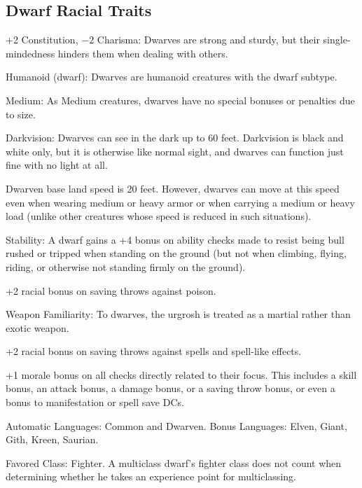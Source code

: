 \subsection{Dwarf Racial Traits}
\begin{itemize*}
    \item +2 Constitution, $-2$ Charisma: Dwarves are strong and sturdy, but their single‐mindedness hinders them when dealing with others.
    \item Humanoid (dwarf): Dwarves are humanoid creatures with the dwarf subtype.
    \item Medium: As Medium creatures, dwarves have no special bonuses or penalties due to size.
    \item Darkvision: Dwarves can see in the dark up to 60 feet. Darkvision is black and white only, but it is otherwise like normal sight, and dwarves can function just fine with no light at all.
    \item Dwarven base land speed is 20 feet. However, dwarves can move at this speed even when wearing medium or heavy armor or when carrying a medium or heavy load (unlike other creatures whose speed is reduced in such situations).
    \item Stability: A dwarf gains a +4 bonus on ability checks made to resist being bull rushed or tripped when standing on the ground (but not when climbing, flying, riding, or otherwise not standing firmly on the ground).
    \item +2 racial bonus on saving throws against poison.
    \item Weapon Familiarity: To dwarves, the urgrosh is treated as a martial rather than exotic weapon.
    \item +2 racial bonus on saving throws against spells and spell-like effects.
    \item +1 morale bonus on all checks directly related to their focus. This includes a skill bonus, an attack bonus, a damage bonus, or a saving throw bonus, or even a bonus to manifestation or spell save DCs.
    \item Automatic Languages: Common and Dwarven. Bonus Languages: Elven, Giant, Gith, Kreen, Saurian.
    \item Favored Class: Fighter. A multiclass dwarf's fighter class does not count when determining whether he takes an experience point for multiclassing.
\end{itemize*}